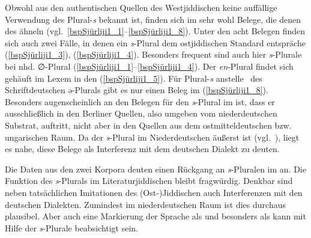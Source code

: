  


Obwohl aus den authentischen Quellen des Westjiddischen keine auffällige Verwendung des Plural-\textit{s} bekannt ist, finden sich im  sehr wohl Belege, die denen des  ähneln (vgl.\, \ref{bspSjürliji1_1}–\ref{bspSjürliji1_8}). Unter den acht Belegen finden sich auch zwei Fälle, in denen ein \textit{s}-Plural dem ostjiddischen Standard entspräche (\ref{bspSjürliji1_3}), (\ref{bspSjürliji1_4}). Besonders frequent sind auch hier \textit{s}-Plurale bei nhd. ∅-Plural (\ref{bspSjürliji1_1}–\ref{bspSjürliji1_4}).  Der \textit{en}-Plural findet sich gehäuft im Lexem  in den  (\ref{bspSjürliji1_5}). Für Plural-\textit{s} anstelle \,%
des Schriftdeutschen ə-Plurals gibt es nur einen Beleg im  (\ref{bspSjürliji1_8}). Besonders augenscheinlich an den Belegen für den \textit{s}-Plural im  ist, dass er ausschließlich in den Berliner Quellen, also umgeben vom niederdeutschen Substrat, auftritt, nicht aber in den Quellen aus dem ostmitteldeutschen bzw. ungarischen Raum. Da der \textit{s}-Plural im Niederdeutschen äußerst  ist (vgl.\, \citealt[147–150]{Lindowetal1998}), liegt es nahe, diese Belege als Interferenz mit dem deutschen Dialekt zu deuten. 

 
Die Daten aus den zwei Korpora deuten einen Rückgang an \textit{s}-Pluralen im \hai{{\LiJi}} an. Die Funktion des \textit{s}-Plurals im Literaturjiddischen bleibt fragwürdig. Denkbar sind neben tatsächlichen Imitationen des (Ost-)Jiddischen auch Interferenzen mit den deutschen Dialekten. Zumindest im niederdeutschen Raum ist dies durchaus plausibel. Aber auch eine Markierung der Sprache als  und besonders als  kann mit Hilfe der \textit{s}-Plurale beabsichtigt sein.


